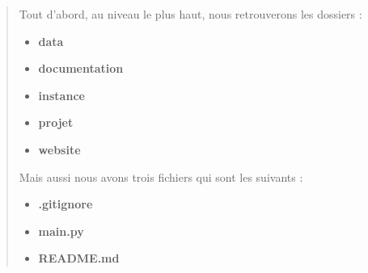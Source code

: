 \documentclass{article}
\begin{document}
\begin{quote}
\begin{center}
\begin{minipage}{\linewidth}
\vspace*{2\baselineskip}
Tout d'abord, au niveau le plus haut, nous retrouverons les dossiers :
            \begin{center}
                \begin{itemize}
                    \item \textbf{data}
                    \item \textbf{documentation} 
                    \item \textbf{instance} 
                    \item \textbf{projet}
                    \item \textbf{website}
                \end{itemize}
            \end{center}
\vspace*{2\baselineskip}
    Mais aussi nous avons trois fichiers qui sont les suivants :
            \begin{center}
                \begin{itemize}
                    \item \textbf{.gitignore}
                    \item \textbf{main.py}
                    \item \textbf{README.md}
                \end{itemize}
            \end{center}
        \end{minipage}
    \end{center}

    
\end{quote}
\newpage
\end{document}
